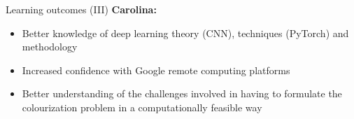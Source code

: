 \documentclass{beamer}
\begin{document}
\begin{frame}{Learning outcomes (III)}
  \textbf{Carolina:}
    \begin{itemize}
      \item Better knowledge of deep learning theory (CNN), techniques
            (PyTorch) and methodology
      \item Increased confidence with Google remote computing platforms
      \item Better understanding of the challenges involved in having to
            formulate the colourization problem in a computationally feasible
            way
    \end{itemize}
\end{frame}
\end{document}
